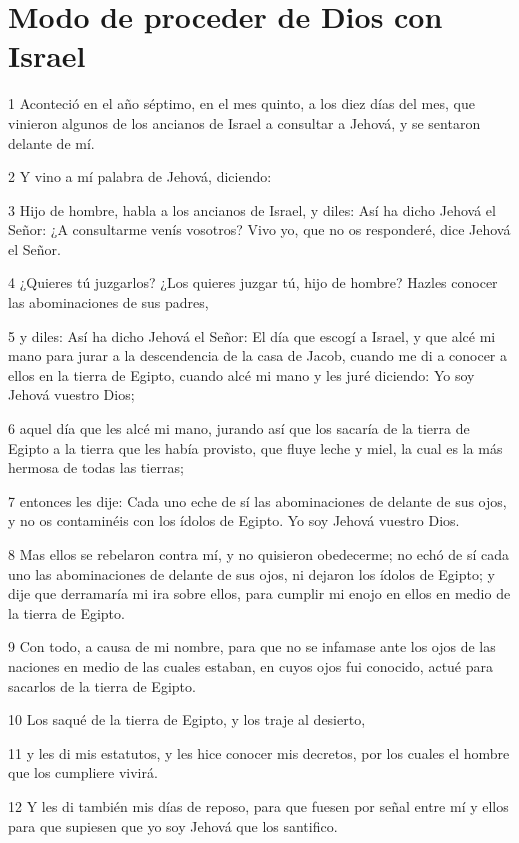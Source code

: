 \section*{Modo de proceder de Dios con Israel}

\par 1 Aconteció en el año séptimo, en el mes quinto, a los diez días del mes, que vinieron algunos de los ancianos de Israel a consultar a Jehová, y se sentaron delante de mí.
\par 2 Y vino a mí palabra de Jehová, diciendo:
\par 3 Hijo de hombre, habla a los ancianos de Israel, y diles: Así ha dicho Jehová el Señor: ¿A consultarme venís vosotros? Vivo yo, que no os responderé, dice Jehová el Señor.
\par 4 ¿Quieres tú juzgarlos? ¿Los quieres juzgar tú, hijo de hombre? Hazles conocer las abominaciones de sus padres, 
\par 5 y diles: Así ha dicho Jehová el Señor: El día que escogí a Israel, y que alcé mi mano para jurar a la descendencia de la casa de Jacob, cuando me di a conocer a ellos en la tierra de Egipto, cuando alcé mi mano y les juré diciendo: Yo soy Jehová vuestro Dios;
\par 6 aquel día que les alcé mi mano, jurando así que los sacaría de la tierra de Egipto a la tierra que les había provisto, que fluye leche y miel, la cual es la más hermosa de todas las tierras; 
\par 7 entonces les dije: Cada uno eche de sí las abominaciones de delante de sus ojos, y no os contaminéis con los ídolos de Egipto. Yo soy Jehová vuestro Dios.
\par 8 Mas ellos se rebelaron contra mí, y no quisieron obedecerme; no echó de sí cada uno las abominaciones de delante de sus ojos, ni dejaron los ídolos de Egipto; y dije que derramaría mi ira sobre ellos, para cumplir mi enojo en ellos en medio de la tierra de Egipto.
\par 9 Con todo, a causa de mi nombre, para que no se infamase ante los ojos de las naciones en medio de las cuales estaban, en cuyos ojos fui conocido, actué para sacarlos de la tierra de Egipto.
\par 10 Los saqué de la tierra de Egipto, y los traje al desierto,
\par 11 y les di mis estatutos, y les hice conocer mis decretos, por los cuales el hombre que los cumpliere vivirá.
\par 12 Y les di también mis días de reposo, para que fuesen por señal entre mí y ellos para que supiesen que yo soy Jehová que los santifico.
